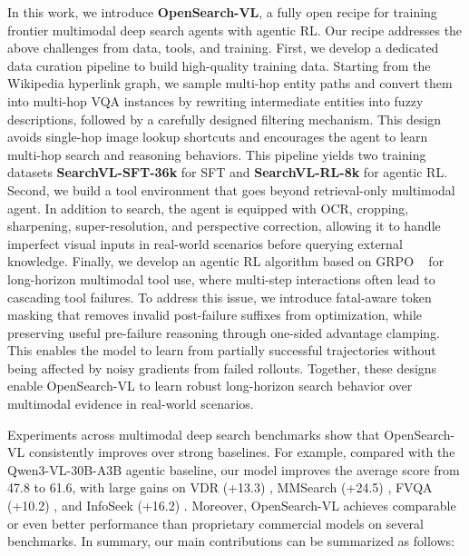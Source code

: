 In this work, we introduce \textbf{OpenSearch-VL}, a fully open recipe for training frontier multimodal deep search agents with agentic RL. 
Our recipe addresses the above challenges from data, tools, and training. 
First, we develop a dedicated data curation pipeline to build high-quality training data. 
Starting from the Wikipedia hyperlink graph, we sample multi-hop entity paths and convert them into multi-hop VQA instances by rewriting intermediate entities into fuzzy descriptions, followed by a carefully designed filtering mechanism.
This design avoids single-hop image lookup shortcuts and encourages the agent to learn multi-hop search and reasoning behaviors.
This pipeline yields two training datasets \textbf{SearchVL-SFT-36k} for SFT and \textbf{SearchVL-RL-8k} for agentic RL.
Second, we build a tool environment that goes beyond retrieval-only multimodal agent. 
In addition to search, the agent is equipped with OCR, cropping, sharpening, super-resolution, and perspective correction, allowing it to handle imperfect visual inputs in real-world scenarios before querying external knowledge. 
Finally, we develop an agentic RL algorithm based on GRPO ~\citep{guo2025deepseek} for long-horizon multimodal tool use, where multi-step interactions often lead to cascading tool failures. To address this issue, we introduce fatal-aware token masking that removes invalid post-failure suffixes from optimization, while preserving useful pre-failure reasoning through one-sided advantage clamping. This enables the model to learn from partially successful trajectories without being affected by noisy gradients from failed rollouts.
Together, these designs enable OpenSearch-VL to learn robust long-horizon search behavior over multimodal evidence in real-world scenarios.


Experiments across multimodal deep search benchmarks show that OpenSearch-VL consistently improves over strong baselines. 
For example, compared with the Qwen3-VL-30B-A3B \citep{Qwen3-VL} agentic baseline, our model improves the average score from 47.8 to 61.6, with large gains on VDR (+13.3) \citep{vdr}, MMSearch (+24.5) \citep{mmsearch}, FVQA (+10.2) \citep{wang2017fvqa}, and InfoSeek (+16.2) \citep{chen2023can}. 
Moreover, OpenSearch-VL achieves comparable or even better performance than proprietary commercial models on several benchmarks.
In summary, our main contributions can be summarized as follows:

